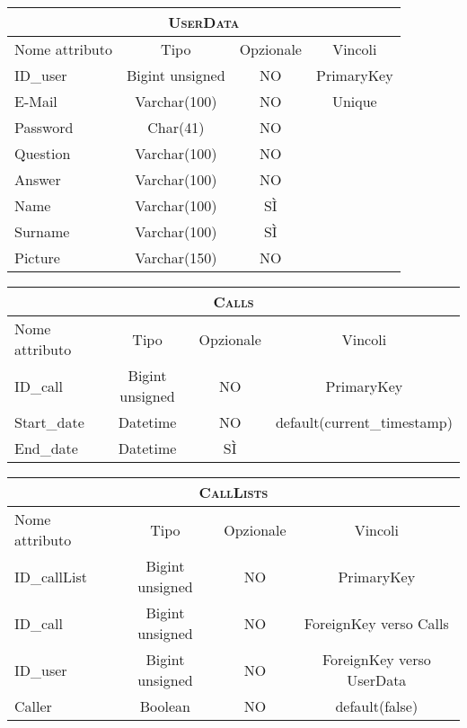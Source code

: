\begin{center}

\begin{tabular}{lccc}
\toprule
\multicolumn{4}{c}{\scshape\bfseries UserData}\\
\midrule
Nome attributo & Tipo & Opzionale & Vincoli\\
\midrule
ID\_user & Bigint unsigned & NO & PrimaryKey\\
E-Mail & Varchar(100) & NO & Unique\\
Password & Char(41) & NO &\\
Question & Varchar(100) & NO &\\
Answer & Varchar(100) & NO &\\
Name & Varchar(100) & SÌ &\\
Surname & Varchar(100) & SÌ &\\
Picture & Varchar(150) & NO &\\
\bottomrule
\end{tabular}

\bigskip

\begin{tabular}{lccc}
\toprule
\multicolumn{4}{c}{\scshape\bfseries Calls}\\
\midrule
Nome attributo & Tipo & Opzionale & Vincoli\\
\midrule
ID\_call & Bigint unsigned & NO & PrimaryKey\\
Start\_date & Datetime & NO & default(current\_timestamp)\\
End\_date & Datetime & SÌ &\\
\bottomrule
\end{tabular}

\bigskip

\begin{tabular}{lccc}
\toprule
\multicolumn{4}{c}{\scshape\bfseries CallLists}\\
\midrule
Nome attributo & Tipo & Opzionale & Vincoli\\
\midrule
ID\_callList & Bigint unsigned & NO & PrimaryKey\\
ID\_call & Bigint unsigned & NO & ForeignKey verso Calls\\
ID\_user & Bigint unsigned & NO & ForeignKey verso UserData \\
Caller & Boolean & NO & default(false)\\
\bottomrule
\end{tabular}


\end{center}
